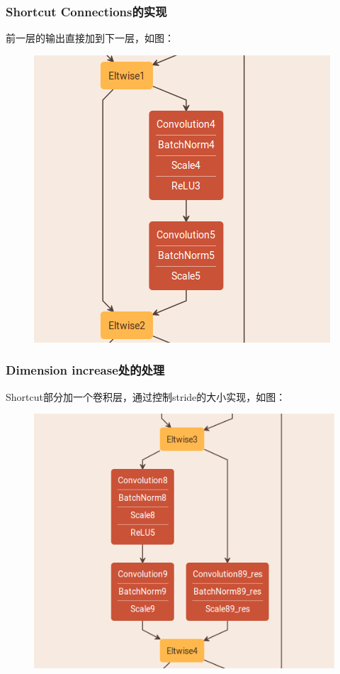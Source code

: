 \documentclass[UTF8]{ctexart}
\begin{document}
		\subsubsection{Shortcut Connections的实现}
		前一层的输出直接加到下一层，如图：
		\begin{figure}
			\centering
			\includegraphics[scale=0.4]{2.png}
		\end{figure}
		
		\subsubsection{Dimension increase处的处理}
		Shortcut部分加一个卷积层，通过控制stride的大小实现，如图：
		\begin{figure}
			\centering
			\includegraphics[scale=0.4]{3.png}
		\end{figure}
\end{document}
